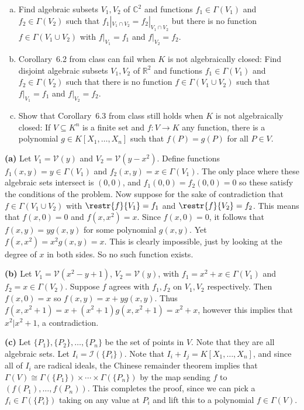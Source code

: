 \documentclass[11pt,letterpaper]{article}
\begin{document}
\begin{problem}\noindent
    \begin{enumerate}[(a)]
        \item Find algebraic subsets $V_1,V_2$ of $\mathbb C^2$ and functions $f_1\in\Gamma(V_1)$ and $f_2\in\Gamma(V_2)$ such that $f_1|_{V_1\cap V_2}=f_2|_{V_1\cap V_2}$ but there is no function $f\in\Gamma(V_1\cup V_2)$ with $f|_{V_1} = f_1$ and $f|_{V_2} = f_2$.
        \item Corollary~6.2 from class can fail when $K$ is not algebraically closed: Find disjoint algebraic subsets $V_1,V_2$ of $\mathbb R^2$ and functions $f_1\in\Gamma(V_1)$ and $f_2\in\Gamma(V_2)$ such that there is no function $f\in\Gamma(V_1\cup V_2)$ such that $f|_{V_1} = f_1$ and $f|_{V_2} = f_2$.
        \item Show that Corollary~6.3 from class still holds when $K$ is not algebraically closed: If $V\subseteq K^n$ is a finite set and $f:V\rightarrow K$ any function, there is a polynomial $g\in K[X_1,\dots,X_n]$ such that $f(P)=g(P)$ for all $P\in V$.
    \end{enumerate}    
\end{problem}

\begin{solution}
    \textbf{(a)} Let $V_1=\mathcal{V}(y)$ and $V_2=\mathcal{V}(y-x^2)$. Define functions $f_1(x,y)=y\in \Gamma(V_1)$ and $f_2(x,y)=x\in\Gamma(V_1)$. The only place where these algebraic sets intersect is $(0,0)$, and $f_1(0,0)=f_2(0,0)=0$ so these satisfy the conditions of the problem. Now suppose for the sake of contradiction that $f\in \Gamma(V_1\cup V_2)$ with $\restr{f}{V_1}=f_1$ and $\restr{f}{V_2}=f_2$. This means that $f(x,0)=0$ and $f(x,x^2)=x$. Since $f(x,0)=0$, it follows that $f(x,y)=yg(x,y)$ for some polynomial $g(x,y)$. Yet $f(x,x^2)=x^2g(x,y)=x$. This is clearly impossible, just by looking at the degree of $x$ in both sides. So no such function exists. 
    
    \textbf{(b)} Let $V_1=\mathcal{V}(x^2-y+1)$, $V_2=\mathcal{V}(y)$, with $f_1=x^2+x\in \Gamma(V_1)$ and $f_2=x\in \Gamma(V_2)$. Suppose $f$ agrees with $f_1,f_2$ on $V_1,V_2$ respectively. Then $f(x,0)=x$ so $f(x,y)=x+yg(x,y)$. Thus $f(x,x^2+1)=x+(x^2+1)g(x,x^2+1)=x^2+x$, however this implies that $x^2|x^2+1$, a contradiction.

    \textbf{(c)} Let $\{P_1\}, \{P_2\}, \ldots, \{P_n\}$ be the set of points in $V$. Note that they are all algebraic sets. Let $I_i=\mathcal{I}(\{P_i\})$. Note that $I_i+I_j=K[X_1,\ldots,X_n]$, and since all of $I_i$ are radical ideals, the Chinese remainder theorem implies that $\Gamma(V)\cong\Gamma(\{P_1\})\times\cdots\times \Gamma(\{P_n\})$ by the map sending $f$ to $(f(P_1), \ldots, f(P_n))$. This completes the proof, since we can pick a $f_i\in \Gamma(\{P_i\})$ taking on any value at $P_i$ and lift this to a polynomial $f\in \Gamma(V)$.
\end{solution}
\end{document}

